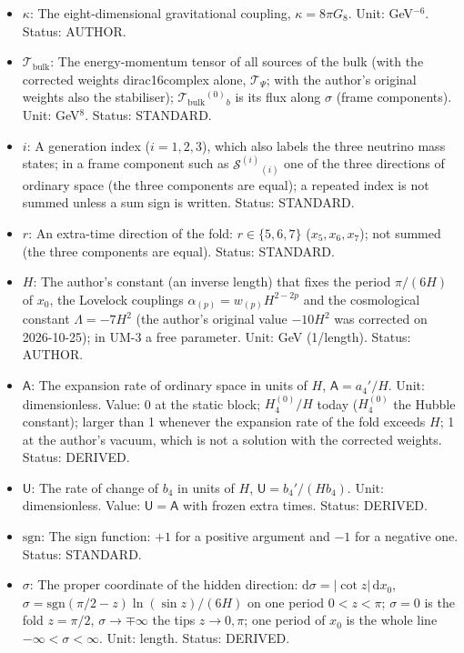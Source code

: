 \documentclass[
  10pt,
]{article}
\providecommand{\tightlist}{%
  \setlength{\itemsep}{0pt}\setlength{\parskip}{0pt}}
\begin{document}
\begin{itemize}
\tightlist
\item
  \(\kappa\): The eight-dimensional gravitational coupling,
  \(\kappa = 8\pi G_8\). Unit: GeV\(^{-6}\). Status: AUTHOR.
\item
  \(\mathcal{T}_{\mathrm{bulk}}\): The energy-momentum tensor of all
  sources of the bulk (with the corrected weights dirac16complex alone,
  \(\mathcal{T}_\Psi\); with the author's original weights also the
  stabiliser); \(\mathcal{T}_{\mathrm{bulk}}{}^{(0)}{}_b\) is its flux
  along \(\sigma\) (frame components). Unit: GeV\(^8\). Status:
  STANDARD.
\item
  \(i\): A generation index (\(i = 1, 2, 3\)), which also labels the
  three neutrino mass states; in a frame component such as
  \(\mathcal{S}^{(i)}{}_{(i)}\) one of the three directions of ordinary
  space (the three components are equal); a repeated index is not summed
  unless a sum sign is written. Status: STANDARD.
\item
  \(r\): An extra-time direction of the fold: \(r \in \{5, 6, 7\}\)
  (\(x_5, x_6, x_7\)); not summed (the three components are equal).
  Status: STANDARD.
\item
  \(H\): The author's constant (an inverse length) that fixes the period
  \(\pi/(6H)\) of \(x_0\), the Lovelock couplings
  \(\alpha_{(p)} = w_{(p)}H^{2-2p}\) and the cosmological constant
  \(\Lambda = -7H^2\) (the author's original value \(-10H^2\) was
  corrected on 2026-10-25); in UM-3 a free parameter. Unit: GeV
  (1/length). Status: AUTHOR.
\item
  \(\mathsf{A}\): The expansion rate of ordinary space in units of
  \(H\), \(\mathsf{A} = a_4'/H\). Unit: dimensionless. Value: 0 at the
  static block; \(H_4^{(0)}/H\) today (\(H_4^{(0)}\) the Hubble
  constant); larger than 1 whenever the expansion rate of the fold
  exceeds \(H\); 1 at the author's vacuum, which is not a solution with
  the corrected weights. Status: DERIVED.
\item
  \(\mathsf{U}\): The rate of change of \(b_4\) in units of \(H\),
  \(\mathsf{U} = b_4'/(Hb_4)\). Unit: dimensionless. Value:
  \(\mathsf{U} = \mathsf{A}\) with frozen extra times. Status: DERIVED.
\item
  \(\mathrm{sgn}\): The sign function: \(+1\) for a positive argument
  and \(-1\) for a negative one. Status: STANDARD.
\item
  \(\sigma\): The proper coordinate of the hidden direction:
  \(\mathrm{d}\sigma = \lvert\cot z\rvert\,\mathrm{d}x_0\),
  \(\sigma = \mathrm{sgn}(\pi/2 - z)\ln(\sin z)/(6H)\) on one period
  \(0 < z < \pi\); \(\sigma = 0\) is the fold \(z = \pi/2\),
  \(\sigma \to \mp\infty\) the tips \(z \to 0, \pi\); one period of
  \(x_0\) is the whole line \(-\infty < \sigma < \infty\). Unit: length.
  Status: DERIVED.
\end{itemize}
\end{document}
